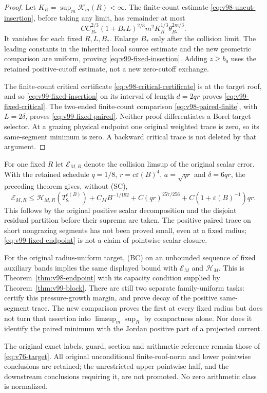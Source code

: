 \begin{proof}
Let $K_R=\sup_m\mathcal K_m(R)<\infty$. The finite-count estimate
\eqref{eq:v98-uncut-insertion}, before taking any limit, has remainder
at most
\[
 C C_{B_*}^{2/3}(1+B_*L)^{2/3}
                     m^2K_R^{1/3}\theta_{B_*}^{2m/3}.
\]
It vanishes for each fixed $R,L,B_*$. Enlarge $B_*$ only after the
collision limit. The leading constants in the inherited local source
estimate and the new geometric comparison are uniform, proving
\eqref{eq:v99-fixed-insertion}. Adding $z\ge b_0$ uses the retained
positive-cutoff estimate, not a new zero-cutoff exchange.

The finite-count critical certificate
\eqref{eq:v98-critical-certificate} is at the target roof, and so
\eqref{eq:v99-fixed-insertion} on its interval of length $d=2qr$
proves \eqref{eq:v99-fixed-critical}. The two-ended finite-count
comparison \eqref{eq:v98-paired-finite}, with $L=2\delta$, proves
\eqref{eq:v99-fixed-paired}. Neither proof differentiates a Borel
target selector. At a grazing physical endpoint one original weighted
trace is zero, so its same-segment minimum is zero. A backward critical
trace is not deleted by that argument.
\end{proof}

For one fixed $R$ let $\mathcal E_{M,R}$ denote the collision limsup
of the original scalar error. With the retained schedule
$q=1/8$, $r=c\varepsilon(B)^4$, $a=\sqrt{qr}$ and $\delta=6qr$,
the preceding theorem gives, without (SC),
\begin{equation}\label{eq:v99-fixed-endpoint}
 \mathcal E_{M,R}\le\mathcal H_{M,R}(T_{\mathsf S}^{\varepsilon(B)})
   +C_MB^{-1/192}+C(qr)^{257/256}
                       +C(1+\varepsilon(B)^{-1})qr.
\end{equation}
This follows by the original positive scalar decomposition and the
disjoint residual partition before their suprema are taken. The
positive paired trace on short nongrazing segments has not been
proved small, even at a fixed radius; \eqref{eq:v99-fixed-endpoint}
is not a claim of pointwise scalar closure.

For the original radius-uniform target, (BC) on an unbounded sequence
of fixed auxiliary bands implies the same displayed bound with
$\mathcal E_M$ and $\mathcal H_M$. This is
Theorem~\ref{thm:v98-endpoint} with its capacity condition supplied
by Theorem~\ref{thm:v99-block}. There are still two separate
family-uniform tasks: certify this pressure-growth margin, and prove
decay of the positive same-segment trace. The new comparison proves
the first at every fixed radius but does not turn that assertion into
$\limsup_m\sup_R$ by compactness alone. Nor does it identify the
paired minimum with the Jordan positive part of a projected current.

The original exact labels, guard, section and arithmetic reference
remain those of \eqref{eq:v76-target}. All original unconditional
finite-roof-norm and lower pointwise conclusions are retained; the
unrestricted upper pointwise half, and the downstream conclusions
requiring it, are not promoted. No zero arithmetic class is normalized.
